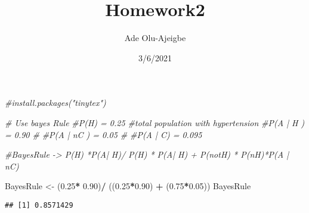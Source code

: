\documentclass[
]{article}
\title{Homework2}
\author{Ade Olu-Ajeigbe}
\date{3/6/2021}
\newenvironment{Shaded}{\begin{snugshade}}{\end{snugshade}}
\newcommand{\CommentTok}[1]{\textcolor[rgb]{0.56,0.35,0.01}{\textit{#1}}}
\newcommand{\FloatTok}[1]{\textcolor[rgb]{0.00,0.00,0.81}{#1}}
\newcommand{\NormalTok}[1]{#1}
\newcommand{\OperatorTok}[1]{\textcolor[rgb]{0.81,0.36,0.00}{\textbf{#1}}}
\newcommand{\StringTok}[1]{\textcolor[rgb]{0.31,0.60,0.02}{#1}}
\begin{document}
\maketitle

\begin{Shaded}
\begin{Highlighting}[]
\CommentTok{#install.packages("tinytex")}
\end{Highlighting}
\end{Shaded}

\begin{Shaded}
\begin{Highlighting}[]
\CommentTok{# Use bayes Rule}
\CommentTok{#P(H) = 0.25 #total population with hypertension}
\CommentTok{#P(A | H ) = 0.90 #}
\CommentTok{#P(A | nC ) = 0.05 #}
\CommentTok{#P(A | C) = 0.095}

\CommentTok{#BayesRule -> P(H) *P(A| H)/ P(H) * P(A| H) + P(notH) * P(nH)*P(A | nC)}

\NormalTok{BayesRule <-}\StringTok{ }\NormalTok{(}\FloatTok{0.25}\OperatorTok{*}\StringTok{ }\FloatTok{0.90}\NormalTok{)}\OperatorTok{/}\StringTok{ }\NormalTok{((}\FloatTok{0.25}\OperatorTok{*}\FloatTok{0.90}\NormalTok{) }\OperatorTok{+}\StringTok{ }\NormalTok{(}\FloatTok{0.75}\OperatorTok{*}\FloatTok{0.05}\NormalTok{))}
\NormalTok{BayesRule}
\end{Highlighting}
\end{Shaded}

\begin{verbatim}
## [1] 0.8571429
\end{verbatim}
\end{document}
